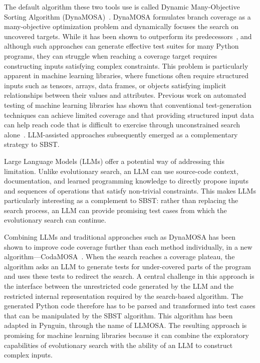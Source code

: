 \documentclass{article}
\begin{document}
The default algorithm these two tools use is called Dynamic Many-Objective Sorting Algorithm (DynaMOSA)~\cite{7840029}. DynaMOSA formulates branch coverage as a many-objective optimization problem and dynamically focuses the search on uncovered targets. While it has been shown to outperform its predecessors~\cite{7840029}, and although such approaches can generate effective test suites for many Python programs, they can struggle when reaching a coverage target requires constructing inputs satisfying complex constraints. This problem is particularly apparent in machine learning libraries, where functions often require structured inputs such as tensors, arrays, data frames, or objects satisfying implicit relationships between their values and attributes. Previous work on automated testing of machine learning libraries has shown that conventional test-generation techniques can achieve limited coverage and that providing structured input data can help reach code that is difficult to exercise through unconstrained search alone~\cite{Lucas_Berg_Improving_automated_unit_test_generation_for_machine_learning_libraries_using_structured_input_data_2024}. LLM-assisted approaches subsequently emerged as a complementary strategy to SBST.

Large Language Models (LLMs) offer a potential way of addressing this limitation. Unlike evolutionary search, an LLM can use source-code context, documentation, and learned programming knowledge to directly propose inputs and sequences of operations that satisfy non-trivial constraints. This makes LLMs particularly interesting as a complement to SBST: rather than replacing the search process, an LLM can provide promising test cases from which the evolutionary search can continue.

Combining LLMs and traditional approaches such as DynaMOSA has been shown to improve code coverage further than each method individually, in a new algorithm---CodaMOSA~\cite{10172800}. When the search reaches a coverage plateau, the algorithm asks an LLM to generate tests for under-covered parts of the program and uses these tests to redirect the search. A central challenge in this approach is the interface between the unrestricted code generated by the LLM and the restricted internal representation required by the search-based algorithm. The generated Python code therefore has to be parsed and transformed into test cases that can be manipulated by the SBST algorithm. This algorithm has been adapted in Pynguin, through the name of LLMOSA. The resulting approach is promising for machine learning libraries because it can combine the exploratory capabilities of evolutionary search with the ability of an LLM to construct complex inputs.
\end{document}
